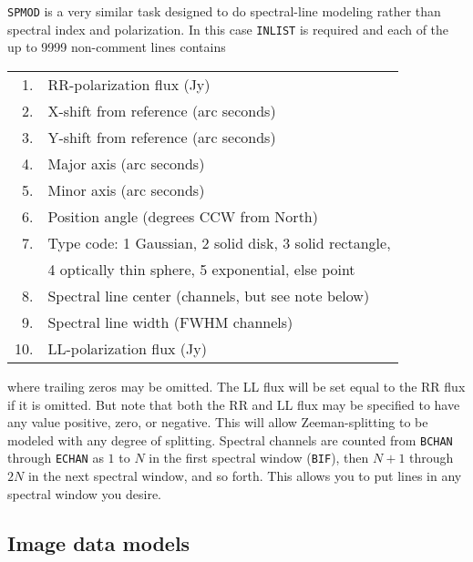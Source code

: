 \documentclass[twoside]{article}
\begin{document}
{\tt SPMOD} is a very similar task designed to do spectral-line
modeling rather than spectral index and polarization.  In this case
{\tt INLIST} is required and each of the up to 9999 non-comment lines
contains
\begin{center}
\begin{tabular}{|r|l|}\hline
 1. & RR-polarization flux (Jy)\\
 2. & X-shift from reference (arc seconds)\\
 3. & Y-shift from reference (arc seconds)\\
 4. & Major axis (arc seconds)\\
 5. & Minor axis (arc seconds)\\
 6. & Position angle (degrees CCW from North)\\
 7. & Type code: 1 Gaussian, 2 solid disk, 3 solid rectangle,\\
    & 4 optically thin sphere, 5 exponential, else point\\
 8. & Spectral line center (channels, but see note below)\\
 9. & Spectral line width (FWHM channels)\\
10. & LL-polarization flux (Jy)\\ \hline
\end{tabular}
\end{center}
where trailing zeros may be omitted.  The LL flux will be set equal to
the RR flux if it is omitted.  But note that both the RR and LL flux
may be specified to have any value positive, zero, or negative.  This
will allow Zeeman-splitting to be modeled with any degree of
splitting.  Spectral channels are counted from {\tt BCHAN} through
{\tt ECHAN} as $1$ to $N$ in the first spectral window ({\tt BIF}),
then $N+1$ through $2 N$ in the next spectral window, and so forth.
This allows you to put lines in any spectral window you desire.

\subsection{Image data models}
\end{document}
